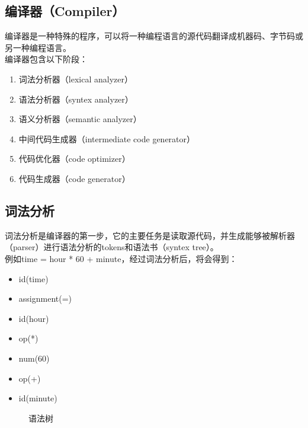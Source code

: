 \subsection{编译器（Compiler）}

编译器是一种特殊的程序，可以将一种编程语言的源代码翻译成机器码、字节码或另一种编程语言。\\

编译器包含以下阶段：

\begin{enumerate}
	\item 词法分析器（lexical analyzer）
	\item 语法分析器（syntex analyzer）
	\item 语义分析器（semantic analyzer）
	\item 中间代码生成器（intermediate code generator）
	\item 代码优化器（code optimizer）
	\item 代码生成器（code generator）
\end{enumerate}

\vspace{0.5cm}

\subsection{词法分析}

词法分析是编译器的第一步，它的主要任务是读取源代码，并生成能够被解析器（parser）进行语法分析的tokens和语法书（syntex tree）。\\

例如time = hour * 60 + minute，经过词法分析后，将会得到：

\begin{itemize}
	\item id(time)
	\item assignment(=)
	\item id(hour)
	\item op(*)
	\item num(60)
	\item op(+)
	\item id(minute)
\end{itemize}

\begin{figure}[H]
	\centering
	\caption{语法树}
\end{figure}

